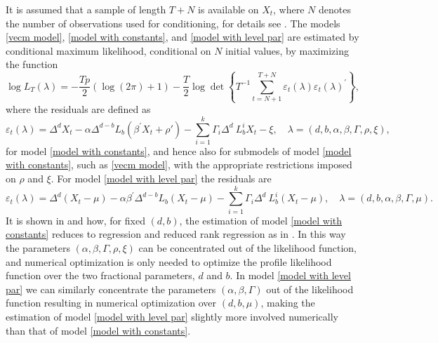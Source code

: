 \documentclass[10pt]{article}
\begin{document}
It is assumed that a sample of length $T+N$ is available on $X_t$, where $N$ denotes the number of observations used for conditioning, for details see \cite{johansen2014initial}. The models \eqref{vecm model}, \eqref{model with constants}, and \eqref{model with level par} are estimated by conditional maximum likelihood, conditional on $N$ initial values, by maximizing the function
\begin{equation}
\log L_{T}(\lambda ) = - \frac{T p}{2} ( \log(2\pi) + 1) 
-\frac{T}{2}\log \det \left\{ T^{-1}\sum_{t=N+1}^{T+N}\varepsilon _{t}(\lambda )\varepsilon _{t}(\lambda)^{\prime }\right\},  \label{Cond Like}
\end{equation}
where the residuals are defined as
\begin{equation}
\varepsilon _{t}(\lambda ) = \Delta^{d}X_{t}- \alpha \Delta^{d-b} L_{b} (\beta^{\prime} X_{t} + \rho') 
 - \sum_{i=1}^{k}\Gamma_{i}\Delta^{d}\ L_{b}^{i}X_{t} - \xi, \quad
\lambda =(d,b,\alpha,\beta,\Gamma,\rho,\xi),
\label{epstau}
\end{equation}
for model \eqref{model with constants}, and hence also for submodels of model \eqref{model with constants}, such as \eqref{vecm model}, with the appropriate restrictions imposed on $\rho$ and $\xi$. For model \eqref{model with level par} the residuals are
\begin{equation}
\varepsilon _{t}(\lambda ) = \Delta^{d}(X_{t}-\mu) -  \alpha \beta^{\prime} \Delta^{d-b} L_{b} (X_{t} - \mu) 
 - \sum_{i=1}^{k}\Gamma_{i}\Delta^{d}\ L_{b}^{i}(X_{t} - \mu), \quad
\lambda =(d,b,\alpha,\beta,\Gamma,\mu).
\label{epstau level}
\end{equation}
It is shown in \cite{johansen2012likelihood} and \cite{Dolatabadi2014} how, for fixed $(d,b)$, the estimation of model \eqref{model with constants} reduces to regression and reduced rank regression as in \cite{Johansen1995}. In this way the parameters $(\alpha ,\beta,\Gamma,\rho,\xi)$ can be concentrated out of the likelihood function, and numerical optimization is only needed to optimize the profile likelihood function over the two fractional parameters, $d$ and $b$. In model \eqref{model with level par} we can similarly concentrate the parameters $(\alpha ,\beta,\Gamma)$ out of the likelihood function resulting in numerical optimization over $(d,b,\mu)$, making the estimation of model \eqref{model with level par} slightly more involved numerically than that of model \eqref{model with constants}.
\end{document}
